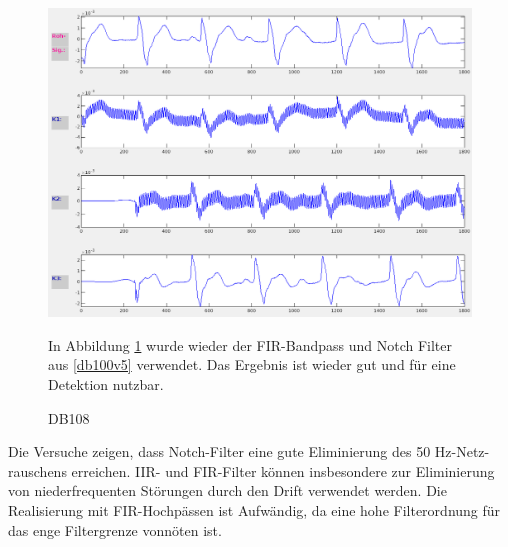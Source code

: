 \documentclass[a4paper,12pt,titlepage]{scrartcl}
\begin{document}
\begin{figure}[ht]
    \begin{minipage}[t]{0.5\linewidth}
        \centering
        \includegraphics[width=0.9\linewidth, valign=t]{Assets/LaborBMT-15-57-50.png}
        \caption{DB108}
        \label{db108}
    \end{minipage}%
    \begin{minipage}[t]{0.5\linewidth}
        In Abbildung \ref{db108} wurde wieder der FIR-Bandpass und Notch Filter aus \ref{db100v5} verwendet. Das Ergebnis ist wieder gut und für eine Detektion nutzbar.

    \end{minipage}
\end{figure}


\cleardoublepage

Die Versuche zeigen, dass Notch-Filter eine gute Eliminierung des 50 Hz-Netz-\\rauschens erreichen. IIR- und FIR-Filter können insbesondere zur Eliminierung von niederfrequenten Störungen durch den Drift verwendet werden.
Die Realisierung mit FIR-Hochpässen ist Aufwändig, da eine hohe Filterordnung für das enge Filtergrenze vonnöten ist.
\end{document}
